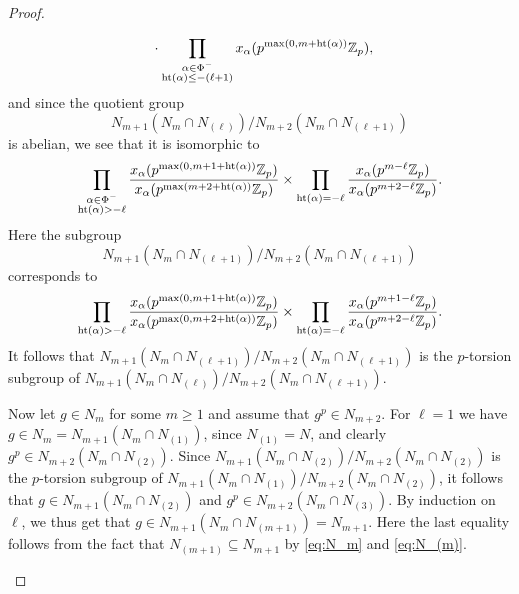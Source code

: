 \begin{proof}
\begin{enumerate}[(i),wide]
\begin{align*}
      &\phantom{{}={}} \cdot \prod_{\substack{\alpha \in \Phi^{-} \\ \Ht(\alpha) \leq -(\ell+1)}} x_\alpha(p^{\max(0,m+\Ht(\alpha))} \Z_p),
    \end{align*}
    and since the quotient group
    \begin{equation*}
      N_{m+1}(N_m \cap N_{(\ell)}) / N_{m+2}(N_m \cap N_{(\ell+1)})
    \end{equation*}
    is abelian, we see that it is isomorphic to
    \begin{equation*}
      \prod_{\substack{\alpha \in \Phi^{-} \\ \operatorname{ht}(\alpha) > -\ell}} \frac{x_\alpha(p^{\max(0,m+1+\operatorname{ht}(\alpha))} \mathbb{Z}_p)}{x_\alpha(p^{\max(m+2+\operatorname{ht}(\alpha))} \mathbb{Z}_p)} \times \prod_{\operatorname{ht}(\alpha) = -\ell} \frac{x_\alpha(p^{m-\ell} \mathbb{Z}_p)}{x_\alpha(p^{m+2-\ell} \mathbb{Z}_p)}.
    \end{equation*}
    Here the subgroup
    \begin{equation*}
      N_{m+1}(N_m \cap N_{(\ell+1)}) / N_{m+2}(N_m \cap N_{(\ell+1)})
    \end{equation*}
    corresponds to
    \begin{equation*}
      \prod_{\operatorname{ht}(\alpha) > -\ell} \frac{x_\alpha(p^{\max(0,m+1+\operatorname{ht}(\alpha))} \mathbb{Z}_p)}{x_\alpha(p^{\max(0,m+2+\operatorname{ht}(\alpha))} \mathbb{Z}_p)} \times \prod_{\operatorname{ht}(\alpha) = -\ell} \frac{x_\alpha(p^{m+1-\ell} \mathbb{Z}_p)}{x_\alpha(p^{m+2-\ell} \mathbb{Z}_p)}.
    \end{equation*}
    It follows that $N_{m+1}(N_m \cap N_{(\ell+1)}) / N_{m+2}(N_m \cap N_{(\ell+1)})$ is the $p$-torsion subgroup of $N_{m+1}(N_m \cap N_{(\ell)}) / N_{m+2}(N_m \cap N_{(\ell+1)})$.

    Now let $g\in N_m$ for some $m\geq1$ and assume that $g^p \in N_{m+2}$. For $\ell = 1$ we have $g \in N_m = N_{m+1}(N_m \cap N_{(1)})$, since $N_{(1)} = N$, and clearly $g^p \in N_{m+2}(N_m \cap N_{(2)})$. Since $N_{m+1}(N_m \cap N_{(2)}) / N_{m+2}(N_m \cap N_{(2)})$ is the $p$-torsion subgroup of $N_{m+1}(N_m \cap N_{(1)}) / N_{m+2}(N_m \cap N_{(2)})$, it follows that $g \in N_{m+1}(N_m \cap N_{(2)})$ and $g^p \in N_{m+2}(N_m \cap N_{(3)})$. By induction on $\ell$, we thus get that $g \in N_{m+1}(N_m \cap N_{(m+1)}) = N_{m+1}$. Here the last equality follows from the fact that $N_{(m+1)} \subseteq N_{m+1}$ by \eqref{eq:N_m} and \eqref{eq:N_(m)}.
  \end{enumerate}
\end{proof}

